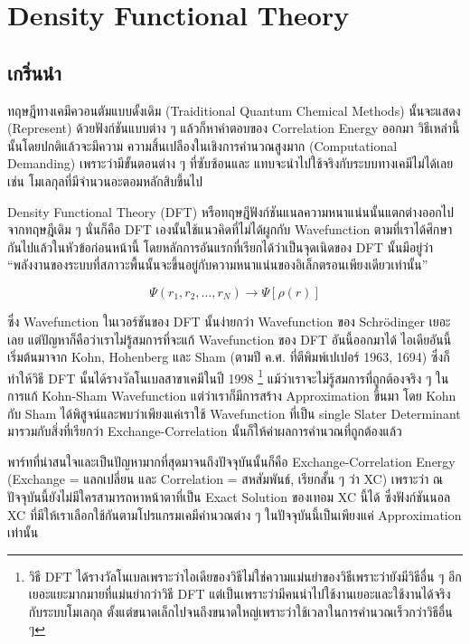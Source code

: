 
\chapter{Density Functional Theory}

\section{เกริ่นนำ}

ทฤษฎีทางเคมีควอนตัมแบบดั้งเดิม (Traiditional Quantum Chemical Methods) นั้นจะแสดง (Represent) 
ด้วยฟังก์ชันแบบต่าง ๆ แล้วก็หาคำตอบของ Correlation Energy ออกมา วิธีเหล่านี้นั้นโดยปกติแล้วจะมีความ%
ความสิ้นเปลืองในเชิงการคำนวณสูงมาก (Computational Demanding) เพราะว่ามีขั้นตอนต่าง ๆ ที่ซับซ้อนและ%
แทบจะนำไปใช้จริงกับระบบทางเคมีไม่ได้เลย เช่น โมเลกุลที่มีจำนวนอะตอมหลักสิบขึ้นไป

Density Functional Theory (DFT) หรือทฤษฎีฟังก์ชันแนลความหนาแน่นนั้นแตกต่างออกไปจากทฤษฎีเดิม ๆ 
นั่นก็คือ DFT เองนั้นใช้แนวคิดที่ไม่ได้ผูกกับ Wavefunction ตามที่เราได้ศึกษากันไปแล้วในหัวข้อก่อนหน้านี้ 
โดยหลักการอันแรกที่เรียกได้ว่าเป็นจุดเนิดของ DFT นั้นมีอยู่ว่า 
\enquote{พลังงานของระบบที่สภาวะพื้นนั้นจะขึ้นอยู่กับความหนาแน่นของอิเล็กตรอนเพียงเดียวเท่านั้น}

\begin{equation}
    \Psi(r_{1}, r_{2}, \dots, r_{N}) \rightarrow \Psi[\rho(r)]
\end{equation}

\noindent ซึ่ง Wavefunction ในเวอร์ชันของ DFT นั้นง่ายกว่า Wavefunction ของ Schr\"{o}dinger เยอะเลย
แต่ปัญหาก็คือว่าเราไม่รู้สมการที่จะแก้ Wavefunction ของ DFT อันนี้ออกมาได้ ไอเดียอันนี้เริ่มต้นมาจาก
Kohn, Hohenberg และ Sham (ตามปี ค.ศ. ที่ตีพิมพ์เปเปอร์ 1963, 1694) ซึ่งก็ทำให้วิธี
DFT นั้นได้รางวัลโนเบลสาขาเคมีในปี 1998%
\footnote{วิธี DFT ได้รางวัลโนเบลเพราะว่าไอเดียของวิธีไม่ใช่ความแม่นยำของวิธีเพราะว่ายังมีวิธีอื่น ๆ 
อีกเยอะแยะมากมายที่แม่นยำกว่าวิธี DFT แต่เป็นเพราะว่ามีคนนำไปใช้งานเยอะและใช้งานได้จริงกับระบบโมเลกุล%
ตั้งแต่ขนาดเล็กไปจนถึงขนาดใหญ่เพราะว่าใช้เวลาในการคำนวณเร็วกว่าวิธีอื่น ๆ} 
แม้ว่าเราจะไม่รู้สมการที่ถูกต้องจริง ๆ ในการแก้ Kohn-Sham Wavefunction แต่ว่าเราก็มีการสร้าง 
Approximation ขึ้นมา โดย Kohn กับ Sham ได้พิสูจน์และพบว่าเพียงแค่เราใช้ Wavefunction ที่เป็น 
single Slater Determinant มารวมกับสิ่งที่เรียกว่า Exchange-Correlation นั้นก็ให้ค่าผลการคำนวณที่ถูกต้องแล้ว

พาร์ทที่น่าสนใจและเป็นปัญหามากที่สุดมาจนถึงปัจจุบันนั้นก็คือ Exchange-Correlation Energy 
(Exchange = แลกเปลี่ยน และ Correlation = สหสัมพันธ์, เรียกสั้น ๆ ว่า XC)  เพราะว่า 
ณ ปัจจุบันนี้ยังไม่มีใครสามารถหาหน้าตาที่เป็น Exact Solution ของเทอม XC นี้ได้ ซึ่งฟังก์ชันนอล XC 
ที่มีให้เราเลือกใช้กันตามโปรแกรมเคมีคำนวณต่าง ๆ ในปัจจุบันนี้เป็นเพียงแค่ Approximation เท่านั้น

